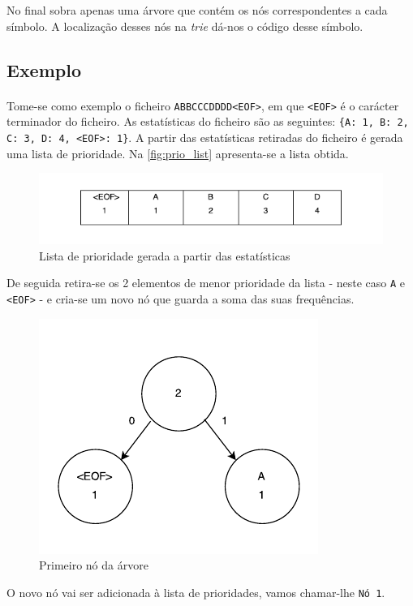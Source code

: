 \documentclass[a4paper]{article}
\begin{document}
	No final sobra apenas uma árvore que contém os nós correspondentes a cada símbolo. A localização desses nós na \textit{trie} dá-nos o código desse símbolo.

	\subsection*{Exemplo}

	\paragraph{} Tome-se como exemplo o ficheiro \texttt{ABBCCCDDDD<EOF>}, em que \texttt{<EOF>} é o carácter terminador do ficheiro. As estatísticas do ficheiro são as seguintes: \texttt{\{A: 1, B: 2, C: 3, D: 4, <EOF>: 1\}}. A partir das estatísticas retiradas do ficheiro é gerada uma lista de prioridade. Na \autoref{fig:prio_list} apresenta-se a lista obtida.

  \begin{figure}[H]
    \centering
    \includegraphics[width=.65\textwidth]{img/prio_list}
    \caption{Lista de prioridade gerada a partir das estatísticas}
    \label{fig:prio_list}
  \end{figure}

  De seguida retira-se os 2 elementos de menor prioridade da lista - neste caso \texttt{A} e \texttt{<EOF>} - e cria-se um novo nó que guarda a soma das suas frequências.

  \begin{figure}[H]
    \centering
    \includegraphics[width=.5\textwidth]{img/trie_1}
    \caption{Primeiro nó da árvore}
    \label{fig:trie_1}
  \end{figure}

  O novo nó vai ser adicionada à lista de prioridades, vamos chamar-lhe \texttt{Nó 1}.
\end{document}
